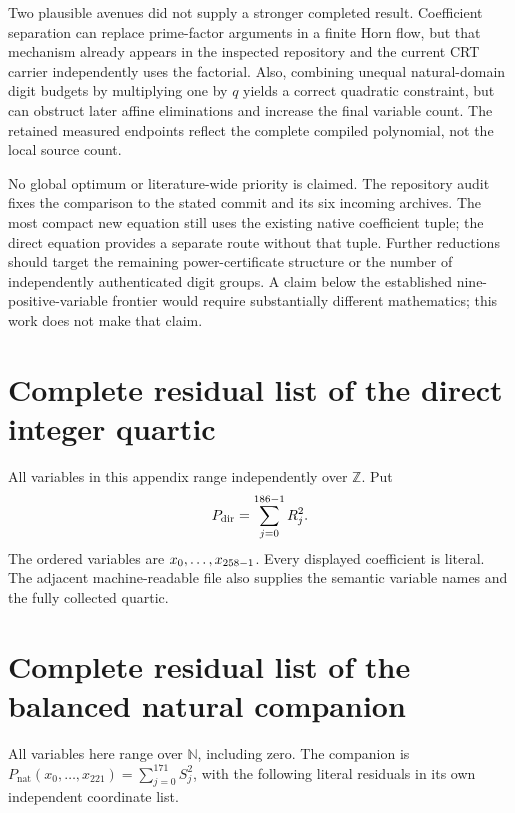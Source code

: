 \documentclass[11pt]{article}
\newcommand{\N}{\mathbb N}
\newcommand{\Z}{\mathbb Z}
\theoremstyle{remark}
\numberwithin{equation}{section}
\begin{document}
Two plausible avenues did not supply a stronger completed result. Coefficient separation can replace prime-factor arguments in a finite Horn flow, but that mechanism already appears in the inspected repository and the current CRT carrier independently uses the factorial. Also, combining unequal natural-domain digit budgets by multiplying one by $q$ yields a correct quadratic constraint, but can obstruct later affine eliminations and increase the final variable count. The retained measured endpoints reflect the complete compiled polynomial, not the local source count.

No global optimum or literature-wide priority is claimed. The repository audit fixes the comparison to the stated commit and its six incoming archives. The most compact new equation still uses the existing native coefficient tuple; the direct equation provides a separate route without that tuple. Further reductions should target the remaining power-certificate structure or the number of independently authenticated digit groups. A claim below the established nine-positive-variable frontier would require substantially different mathematics; this work does not make that claim.

\appendix
\section{Complete residual list of the direct integer quartic}\label{app:direct}

All variables in this appendix range independently over $\Z$. Put
\[
P_{\mathrm{dir}}=\sum_{j=0}^{186-1} R_j^2.
\]
The ordered variables are $x_0,\ldots,x_{258-1}$. Every displayed coefficient is literal. The adjacent machine-readable file also supplies the semantic variable names and the fully collected quartic.


\section{Complete residual list of the balanced natural companion}\label{app:natural}

All variables here range over $\N$, including zero. The companion is
$P_{\mathrm{nat}}(x_0,\ldots,x_{221})=\sum_{j=0}^{171}S_j^2$,
with the following literal residuals in its own independent coordinate list.



\end{document}
